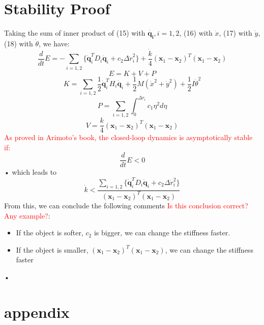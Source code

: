 \documentclass[]{article}
\begin{document}
\section{Stability Proof}
Taking the sum of inner product of (15) with $\mathbf{\dot{q_i}},i=1,2$, (16) with $\dot{x}$, (17) with $\dot{y}$, (18) with $\dot{\theta}$, we have:
\begin{equation}
\frac{d}{dt}E=-\sum\limits_{i=1,2}\{\mathbf{\dot{q}}_i^TD_i\mathbf{\dot{q}}_i+c_2\Delta \dot{r}_i^2\}+\frac{\dot{k}}{4}{(\mathbf{x}_1-\mathbf{x}_2)^T(\mathbf{x}_1-\mathbf{x}_2)}
\end{equation}
\begin{equation}
E=K+V+P
\end{equation}
\begin{equation}
K=\sum\limits_{i=1,2}\frac{1}{2}\mathbf{\dot{q}}_i^TH_i\mathbf{\dot{q}}_i+\frac{1}{2}
M(\dot{x}^2+\dot{y}^2)+\frac{1}{2}I\dot{\theta}^2
\end{equation}
\begin{equation}
P=\sum\limits_{i=1,2}\int_{0}^{\Delta r_i}c_1\eta^2d\eta
\end{equation}
\begin{equation}
V=\frac{k}{4}(\mathbf{x}_1-\mathbf{x}_2)^T(\mathbf{x}_1-\mathbf{x}_2)
\end{equation}
\textcolor{red}{As proved in Arimoto's book, the closed-loop dynamics is asymptotically stable if:}
\begin{equation}
\frac{d}{dt}E<0
\end{equation}•
which leads to
\begin{equation}
\dot{k}<\frac{\sum\limits_{i=1,2}\{\mathbf{\dot{q}}_i^TD_i\mathbf{\dot{q}}_i+c_2\Delta \dot{r}_i^2\}}{(\mathbf{x}_1-\mathbf{x}_2)^T(\mathbf{x}_1-\mathbf{x}_2)}
\end{equation}
From this, we can conclude the following comments \textcolor{red}{Is this conclusion correct? Any example?}:
\begin{itemize}
\item If the object is softer, $c_2$ is bigger, we can change the stiffness faster.
\item If the object is smaller, $(\mathbf{x}_1-\mathbf{x}_2)^T(\mathbf{x}_1-\mathbf{x}_2)$, we can change the stiffness faster
\end{itemize}•

\section{appendix}
\appendix
\end{document}
